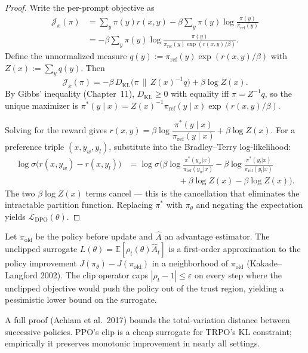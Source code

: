 \begin{proof}
Write the per-prompt objective as
\begin{align*}
\mathcal{J}_x(\pi)
&= \sum_y\pi(y)r(x,y) - \beta\sum_y\pi(y)\log\frac{\pi(y)}{\pi_{\mathrm{ref}}(y)} \\
&= -\beta\sum_y\pi(y)\log\frac{\pi(y)}{\pi_{\mathrm{ref}}(y)\exp(r(x,y)/\beta)}.
\end{align*}
Define the unnormalized measure $q(y):=\pi_{\mathrm{ref}}(y)\exp(r(x,y)/\beta)$ with $Z(x):=\sum_y q(y)$. Then
\[
\mathcal{J}_x(\pi) = -\beta\,D_{\mathrm{KL}}\!\big(\pi\,\|\,Z(x)^{-1}q\big) + \beta\log Z(x).
\]
By Gibbs' inequality (Chapter~11), $D_{\mathrm{KL}}\geq 0$ with equality iff $\pi=Z^{-1}q$, so the unique maximizer is
$\pi^*(y\mid x) = Z(x)^{-1}\pi_{\mathrm{ref}}(y\mid x)\exp(r(x,y)/\beta)$.

Solving for the reward gives
$r(x,y) = \beta\log\!\dfrac{\pi^*(y\mid x)}{\pi_{\mathrm{ref}}(y\mid x)} + \beta\log Z(x).$
For a preference triple $(x,y_w,y_l)$, substitute into the Bradley--Terry log-likelihood:
\begin{align*}
\log\sigma\!\big(r(x,y_w)-r(x,y_l)\big)
&= \log\sigma\!\Bigg(\beta\log\frac{\pi^*(y_w|x)}{\pi_{\mathrm{ref}}(y_w|x)} - \beta\log\frac{\pi^*(y_l|x)}{\pi_{\mathrm{ref}}(y_l|x)} \\
&\hspace{6em}+\beta\log Z(x)-\beta\log Z(x)\Bigg).
\end{align*}
The two $\beta\log Z(x)$ terms cancel --- this is the cancellation that eliminates the intractable partition function. Replacing $\pi^*$ with $\pi_\theta$ and negating the expectation yields $\mathcal{L}_{\mathrm{DPO}}(\theta)$.
\end{proof}

\begin{proposition}
Let $\pi_{\mathrm{old}}$ be the policy before update and $\hat A$ an advantage estimator. The unclipped surrogate $L(\theta)=\mathbb{E}[\rho_t(\theta)\hat A_t]$ is a first-order approximation to the policy improvement $J(\pi_\theta)-J(\pi_{\mathrm{old}})$ in a neighborhood of $\pi_{\mathrm{old}}$ (Kakade--Langford 2002). The clip operator caps $|\rho_t-1|\le\varepsilon$ on every step where the unclipped objective would push the policy out of the trust region, yielding a pessimistic lower bound on the surrogate.
\end{proposition}

\begin{remark}
A full proof (Achiam et al.\ 2017) bounds the total-variation distance between successive policies. PPO's clip is a cheap surrogate for TRPO's KL constraint; empirically it preserves monotonic improvement in nearly all settings.
\end{remark}

